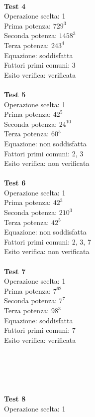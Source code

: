 \documentclass[10pt]{report}
\begin{document}
\\
\textbf{Test 4}\\ 
Operazione scelta: 1\\
Prima potenza: $729^3$\\
Seconda potenza: $1458^3$\\
Terza potenza: $243^4$ \\
Equazione: soddisfatta\\
Fattori primi comuni: 3\\
Esito verifica: verificata\\
\\
\textbf{Test 5} \\
Operazione scelta: 1\\
Prima potenza: $42^5$\\
Seconda potenza: $24^10$\\
Terza potenza: $60^5$\\
Equazione: non soddisfatta\\
Fattori primi comuni: 2, 3\\
Esito verifica: non verificata\\
\\
\textbf{Test 6}\\ 
Operazione scelta: 1\\
Prima potenza: $42^3$\\
Seconda potenza: $210^3$\\
Terza potenza: $42^5$ \\
Equazione: non soddisfatta\\
Fattori primi comuni: 2, 3, 7\\
Esito verifica: non verificata\\
\\
\textbf{Test 7}\\ 
Operazione scelta: 1\\
Prima potenza: $7^62$\\
Seconda potenza: $7^7$\\
Terza potenza: $98^3$ \\
Equazione: soddisfatta\\
Fattori primi comuni: 7\\
Esito verifica: verificata
\\
\\
\\
\\
\\
\\
\textbf{Test 8}\\ 
Operazione scelta: 1\\
\end{document}
